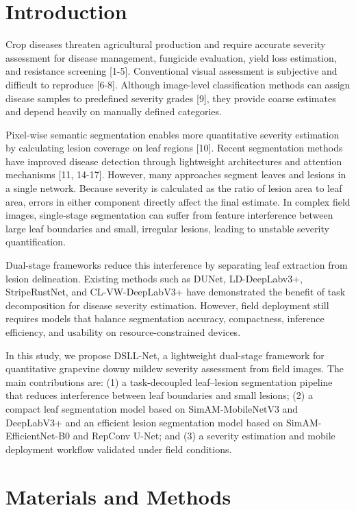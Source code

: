 \documentclass[
]{article}
\begin{document}
\hypertarget{introduction}{%
\section{Introduction}\label{introduction}}

Crop diseases threaten agricultural production and require accurate
severity assessment for disease management, fungicide evaluation, yield
loss estimation, and resistance screening {[}1-5{]}. Conventional visual
assessment is subjective and difficult to reproduce {[}6-8{]}. Although
image-level classification methods can assign disease samples to
predefined severity grades {[}9{]}, they provide coarse estimates and
depend heavily on manually defined categories.

Pixel-wise semantic segmentation enables more quantitative severity
estimation by calculating lesion coverage on leaf regions {[}10{]}.
Recent segmentation methods have improved disease detection through
lightweight architectures and attention mechanisms {[}11, 14-17{]}.
However, many approaches segment leaves and lesions in a single network.
Because severity is calculated as the ratio of lesion area to leaf area,
errors in either component directly affect the final estimate. In complex
field images, single-stage segmentation can suffer from feature
interference between large leaf boundaries and small, irregular lesions,
leading to unstable severity quantification.

Dual-stage frameworks reduce this interference by separating leaf
extraction from lesion delineation. Existing methods such as DUNet,
LD-DeepLabv3+, StripeRustNet, and CL-VW-DeepLabV3+ have demonstrated the
benefit of task decomposition for disease severity estimation. However,
field deployment still requires models that balance segmentation
accuracy, compactness, inference efficiency, and usability on
resource-constrained devices.

In this study, we propose DSLL-Net, a lightweight dual-stage framework
for quantitative grapevine downy mildew severity assessment from field
images. The main contributions are: (1) a task-decoupled leaf--lesion
segmentation pipeline that reduces interference between leaf boundaries
and small lesions; (2) a compact leaf segmentation model based on
SimAM-MobileNetV3 and DeepLabV3+ and an efficient lesion segmentation
model based on SimAM-EfficientNet-B0 and RepConv U-Net; and (3) a
severity estimation and mobile deployment workflow validated under field
conditions.

\hypertarget{materials-and-methods}{%
\section{Materials and Methods}\label{materials-and-methods}}
\end{document}
